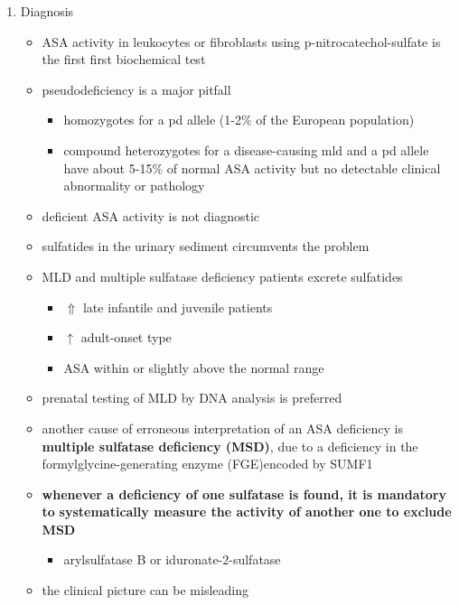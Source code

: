 \documentclass{scrartcl}
\begin{document}
\begin{enumerate}
\item Diagnosis
\label{sec:orge22a2a1}

\begin{itemize}
\item ASA activity in leukocytes or fibroblasts using p-nitrocatechol-sulfate is the first first biochemical test
\item pseudodeficiency is a major pitfall
\begin{itemize}
\item homozygotes for a pd allele (1-2\% of the European population)
\item compound heterozygotes for a disease-causing mld and a pd allele
have about 5-15\% of normal ASA activity but no detectable clinical
abnormality or pathology
\end{itemize}
\item deficient ASA activity is not diagnostic
\item sulfatides in the urinary sediment circumvents the problem
\item MLD and multiple sulfatase deficiency patients excrete sulfatides
\begin{itemize}
\item \(\Uparrow\) late infantile and juvenile patients
\item \(\uparrow\) adult-onset type
\item ASA within or slightly above the normal range
\end{itemize}

\item prenatal testing of MLD by DNA analysis is preferred

\item another cause of erroneous interpretation of an ASA deficiency is
\textbf{multiple sulfatase deficiency (MSD)}, due to a deficiency in the
formylglycine-generating enzyme (FGE)encoded by SUMF1

\item \textbf{whenever a deficiency of one sulfatase is found, it is mandatory to}
\textbf{systematically measure the activity of another one to exclude MSD}
\begin{itemize}
\item arylsulfatase B or iduronate-2-sulfatase
\end{itemize}
\item the clinical picture can be misleading


\end{itemize}
\end{enumerate}
\end{document}
